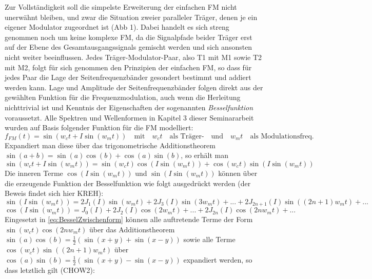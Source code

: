 Zur Vollständigkeit soll die simpelste Erweiterung der einfachen FM nicht unerwähnt bleiben, und zwar die Situation zweier paralleler Träger, denen je ein eigener Modulator zugeordnet ist (Abb 1). Dabei handelt es sich streng genommen noch um keine komplexe FM, da die Signalpfade beider Träger erst auf der Ebene des Gesamtausgangssignals gemischt werden und sich ansonsten nicht weiter beeinflussen. Jedes Träger-Modulator-Paar, also T1 mit M1 sowie T2 mit M2, folgt für sich genommen den Prinzipien der einfachen FM, so dass für jedes Paar die Lage der Seitenfrequenzbänder gesondert bestimmt und addiert werden kann. Lage und Amplitude der Seitenfrequenzbänder folgen direkt aus der gewählten Funktion für die Frequenzmodulation, auch wenn die Herleitung nichttrivial ist und Kenntnis der Eigenschaften der sogenannten \textit{Besselfunktion} voraussetzt. Alle Spektren und Wellenformen in Kapitel 3 dieser Seminararbeit wurden auf Basis folgender Funktion für die FM modelliert:
\label{matze:simplefm}
\begin{equation} \label{eq:SimpleFM}
f_{FM}(t) = \sin(w_ct + I\sin(w_mt)) \quad \text{mit} \quad w_ct \quad \text{als Träger-} \quad \text{und} \quad w_mt \quad \text{als Modulationsfreq.}
\end{equation}
Expandiert man diese über das trigonometrische Additionstheorem \begin{math} \sin(a + b) = \sin(a)\cos(b)+\cos(a)\sin(b) \end{math}, so erhält man 
\begin{equation}\label{eq:BesselZwischenform}
\sin(w_ct + I\sin(w_mt)) = \sin(w_ct)\cos(I\sin(w_mt)) + \cos(w_ct)\sin(I\sin(w_mt))
\end{equation}
Die inneren Terme \begin{math} \cos(I\sin(w_mt)) \end{math} und \begin{math} \sin(I\sin(w_mt)) \end{math} können über die erzeugende Funktion der Besselfunktion wie folgt ausgedrückt werden (der Beweis findet sich hier KREH):
\begin{equation}\label{eq:Besselsin}
\sin(I\sin(w_mt)) = 2J_1(I)\sin(w_mt)+2J_3(I)\sin(3w_mt)+...+2J_{2n+1}(I)\sin((2n+1)w_mt)+...
\end{equation}
\begin{equation}\label{eq:Besselcos}
\cos(I\sin(w_mt)) = J_0(I)+2J_2(I)\cos(2w_mt)+...+2J_{2n}(I)\cos(2nw_mt)+...
\end{equation}
Eingesetzt in \ref{eq:BesselZwischenform} können alle auftretende Terme der Form \begin{math} \sin(w_ct)\cos(2nw_mt) \end{math} über das Additionstheorem \begin{math} \sin(a)\cos(b) = \frac{1}{2}\left(\sin(x+y)+\sin(x-y)\right) \end{math} sowie alle Terme \begin{math} \cos(w_ct)\sin((2n+1)w_mt) \end{math} über  \begin{math} \cos(a)\sin(b) = \frac{1}{2}\left(\sin(x+y)-\sin(x-y)\right) \end{math} expandiert werden, so dass letztlich gilt (CHOW2): 
